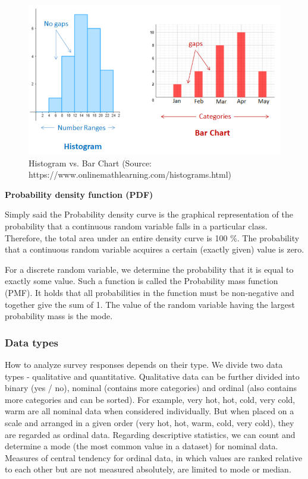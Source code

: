 \documentclass[a4paper,10pt,twoside]{article}
\begin{document}
\vspace{0.3cm}
\begin{figure}[hbt!]
\begin{center}
\includegraphics[width=12.5cm]{../pictures/histogram_barchart.png}
\caption[Histogram vs. Bar Chart (boxplot)]{Histogram vs. Bar Chart (Source: https://www.onlinemathlearning.com/histograms.html)}
\label{fig:histogram_barchart}
\end{center}
\end{figure}

\bigskip
\noindent \textbf {Probability density function (PDF)}

\noindent Simply said the Probability density curve is the graphical representation of the probability that a continuous random variable falls in a particular class. Therefore, the total area under an entire density curve is 100 \%. The probability that a continuous random variable acquires a certain (exactly given) value is zero.

For a discrete random variable, we determine the probability that it is equal to exactly some value. Such a function is called the Probability mass function (PMF). It holds that all probabilities in the function must be non-negative and together give the sum of 1. The value of the random variable having the largest probability mass is the mode.

\newpage
\vspace*{-1cm}
\subsubsection{Data types}

How to analyze survey responses depends on their type. We divide two data types - qualitative and quantitative. Qualitative data can be further divided into binary (yes / no), nominal (contains more categories) and ordinal (also contains more categories and can be sorted). For example, very hot, hot, cold, very cold, warm are all nominal data when considered individually. But when placed on a scale and arranged in a given order (very hot, hot, warm, cold, very cold), they are regarded as ordinal data. Regarding descriptive statistics, we can count and determine a mode (the most common value in a dataset) for nominal data. Measures of central tendency for ordinal data, in which values are ranked relative to each other but are not measured absolutely, are limited to mode or median.
\end{document}
